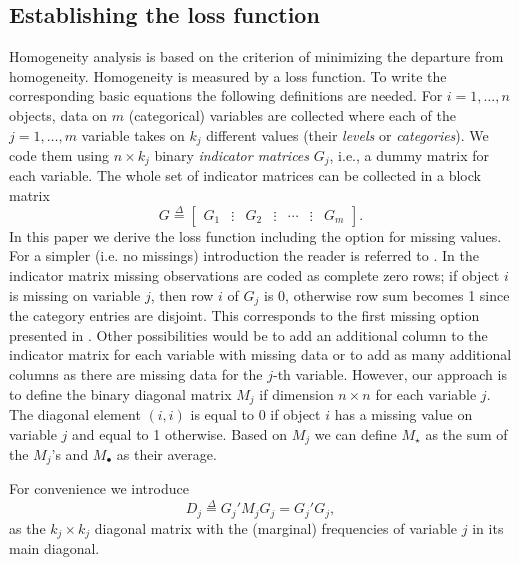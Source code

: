 \documentclass[article]{jss1}
\newcommand{\defi}{\mathop{=}\limits^{\Delta}}
\begin{document}
\subsection{Establishing the loss function}
Homogeneity analysis is based on the criterion of minimizing the departure from homogeneity. Homogeneity is measured by a loss function. To write the corresponding basic equations the following definitions are needed. For $i=1,\ldots,n$ objects, data on $m$ (categorical) variables are collected where each of the $j=1,\ldots,m$ variable takes on $k_j$ different values (their \emph{levels} or \emph{categories}). We code them using $n\times k_j$ binary \emph{indicator matrices} $G_j$, i.e., a dummy matrix for each variable. The whole set of indicator matrices can be collected in a block matrix
\begin{equation}
G\defi\begin{bmatrix}G_1&\vdots&G_2&\vdots&\cdots&\vdots&G_m\end{bmatrix}.
\end{equation}
In this paper we derive the loss function including the option for missing values. For a simpler (i.e. no missings) introduction the reader is referred to \citet[][p. 307--314]{Michailidis+deLeeuw:98}. In the indicator matrix missing observations are coded as complete zero rows; if object $i$ is missing on variable $j$, then row $i$ of $G_j$ is 0, otherwise row sum becomes 1 since the category entries are disjoint. This corresponds to the first missing option presented in \citet[p. 74]{Gifi:90}. Other possibilities would be to add an additional column to the indicator matrix for each variable with missing data or to add as many additional columns as there are missing data for the $j$-th variable. However, our approach is to define the binary diagonal matrix $M_j$ if dimension $n \times n$ for each variable $j$. The diagonal element $(i,i)$ is equal to 0 if object $i$ has a missing value on variable $j$ and equal to 1 otherwise. Based on $M_j$ we can define $M_\star$ as the sum of the $M_j$'s and $M_\bullet$ as their average.  

For convenience we introduce
\begin{equation}
D_j^{}\defi G_j'M_j^{}G_j^{}=G_j'G_j^{},
\end{equation}
as the $k_j\times k_j$ diagonal matrix with the (marginal) frequencies of variable $j$ in its main diagonal. 
\end{document}
